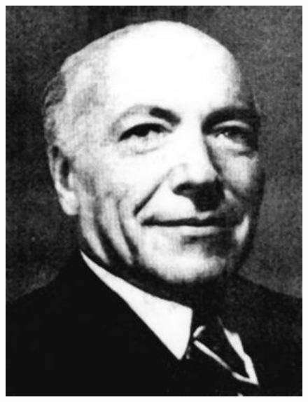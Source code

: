\documentclass[mathserif]{beamer}
\begin{document}
{\begin{figure}
\begin{center}
\begin{minipage}{0.2\textwidth}
      \includegraphics[width=1.0\textwidth]{Egervary.jpg}%
     \end{minipage}%
     \quad
     \begin{minipage}{0.2\textwidth}

\end{minipage}
\end{center}
\end{figure}}
\end{document}
